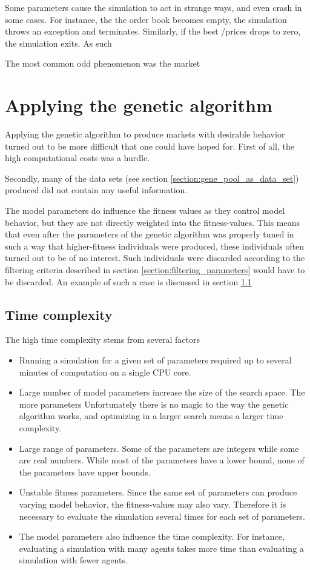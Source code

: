 Some parameters cause the simulation to act in strange ways, and even crash in some cases. For instance, the the order book becomes empty, the simulation throws an exception and terminates. Similarly, if the best \bid/\ask prices drops to zero, the simulation exits. As such 

The most common odd phenomenon was the market 


\section{Applying the genetic algorithm}
Applying the genetic algorithm to produce markets with desirable behavior turned out to be more difficult that one could have hoped for. First of all, the high computational costs was a hurdle. 

Secondly, many of the data sets (see section \ref{section:gene_pool_as_data_set}) produced did not contain any useful information. 

The model parameters do influence the fitness values as they control model behavior, but they are not directly weighted into the fitness-values. This means that even after the parameters of the genetic algorithm was properly tuned in such a way that higher-fitness individuals were produced, these individuals often turned out to be of no interest. Such individuals were discarded according to the filtering criteria described in section \ref{section:filtering_parameters} would have to be discarded. An example of such a case is discussed in section \ref{}

\subsection{Time complexity}
The high time complexity stems from several factors
\begin{itemize}
\item Running a simulation for a given set of parameters required up to several minutes of computation on a single CPU core.
\item Large number of model parameters increase the size of the search space. The more parameters Unfortunately there is no magic to the way the genetic algorithm works, and optimizing in a larger search means a larger time complexity.
\item Large range of parameters. Some of the parameters are integers while some are real numbers. While most of the parameters have a lower bound, none of the parameters have upper bounds.
\item Unstable fitness parameters. Since the same set of parameters can produce varying model behavior, the fitness-values may also vary. Therefore it is necessary to evaluate the simulation several times for each set of parameters. 
\item The model parameters also influence the time complexity. For instance, evaluating a simulation with many agents takes more time than evaluating a simulation with fewer agents. 
\end{itemize}

